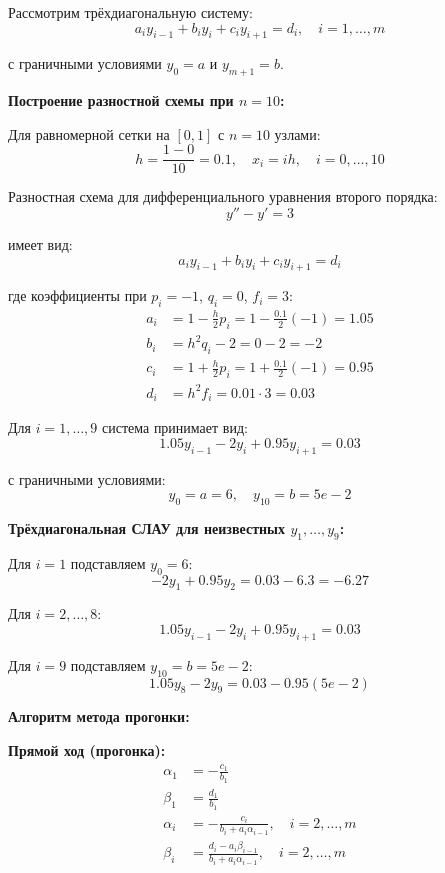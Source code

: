 Рассмотрим трёхдиагональную систему:
\[
    a_i y_{i-1} + b_i y_i + c_i y_{i+1} = d_i, \quad i = 1, \ldots, m
\]

с граничными условиями $y_0 = a$ и $y_{m+1} = b$.

\textbf{Построение разностной схемы при $n = 10$:}

Для равномерной сетки на $[0,1]$ с $n = 10$ узлами:
\[
    h = \frac{1-0}{10} = 0.1, \quad x_i = ih, \quad i = 0, \ldots, 10
\]

Разностная схема для дифференциального уравнения второго порядка:
\[
    y'' - y' = 3
\]

имеет вид:
\[
    a_i y_{i-1} + b_i y_i + c_i y_{i+1} = d_i
\]

где коэффициенты при $p_i = -1$, $q_i = 0$, $f_i = 3$:
\begin{align*}
    a_i & = 1 - \frac{h}{2}p_i = 1 - \frac{0.1}{2}(-1) = 1.05 \\
    b_i & = h^2 q_i - 2 = 0 - 2 = -2                          \\
    c_i & = 1 + \frac{h}{2}p_i = 1 + \frac{0.1}{2}(-1) = 0.95 \\
    d_i & = h^2 f_i = 0.01 \cdot 3 = 0.03
\end{align*}

Для $i = 1, \ldots, 9$ система принимает вид:
\[
    1.05 y_{i-1} - 2 y_i + 0.95 y_{i+1} = 0.03
\]

с граничными условиями:
\[
    y_0 = a = 6, \quad y_{10} = b = 5e - 2
\]

\textbf{Трёхдиагональная СЛАУ для неизвестных $y_1, \ldots, y_9$:}

Для $i = 1$ подставляем $y_0 = 6$:
\[
    -2 y_1 + 0.95 y_2 = 0.03 - 6.3 = -6.27
\]

Для $i = 2, \ldots, 8$:
\[
    1.05 y_{i-1} - 2 y_i + 0.95 y_{i+1} = 0.03
\]

Для $i = 9$ подставляем $y_{10} = b = 5e - 2$:
\[
    1.05 y_8 - 2 y_9 = 0.03 - 0.95(5e - 2)
\]

\textbf{Алгоритм метода прогонки:}

\textbf{Прямой ход (прогонка):}
\begin{align*}
    \alpha_1 & = -\frac{c_1}{b_1}                                                             \\
    \beta_1  & = \frac{d_1}{b_1}                                                              \\
    \alpha_i & = -\frac{c_i}{b_i + a_i \alpha_{i-1}}, \quad i = 2, \ldots, m                  \\
    \beta_i  & = \frac{d_i - a_i \beta_{i-1}}{b_i + a_i \alpha_{i-1}}, \quad i = 2, \ldots, m
\end{align*}

